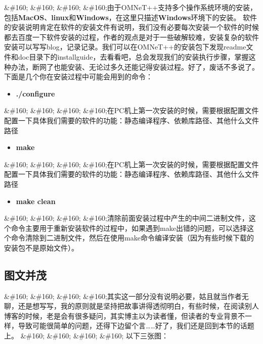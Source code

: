 \&\#160; \&\#160; \&\#160; \&\#160;由于OMNeT++支持多个操作系统环境的安装，包括\textbf{MacOS}、\textbf{linux}和\textbf{Windows}，在这里只描述\textbf{Windows}环境下的安装。
软件的安装说明肯定在软件的安装文件有说明，我们没有必要每次安装一个软件的时候都去百度一下软件安装的过程，作者的观点是对于一些破解较难，安装复杂的软件安装可以写写blog，记录记录。我们可以在OMNeT++的安装包下发现readme文件和doc目录下的installguide，去看看吧，总会发现我们的安装执行步骤，掌握这种办法，断网了也能安装、无论过多久还能记得安装过程。好了，废话不多说了。
下面是几个你在安装过程中可能会用到的命令：

\begin{itemize}
\item \textbf{.\slash configure}

\end{itemize}

\&\#160; \&\#160; \&\#160; \&\#160;在PC机上第一次安装的时候，需要根据配置文件配置一下具体我们需要的软件的功能：静态编译程序、依赖库路径、其他什么文件路径

\begin{itemize}
\item \textbf{make}

\end{itemize}

\&\#160; \&\#160; \&\#160; \&\#160;在PC机上第一次安装的时候，需要根据配置文件配置一下具体我们需要的软件的功能：静态编译程序、依赖库路径、其他什么文件路径

\begin{itemize}
\item \textbf{make clean}

\end{itemize}

\&\#160; \&\#160; \&\#160; \&\#160;清除前面安装过程中产生的中间二进制文件，这个命令主要用于重新安装软件的过程中，如果遇到make出错的问题，可以选择这个命令清除到二进制文件，然后在使用make命令编译安装（因为有些时候下载的安装包不是原始文件）。

\subsection{图文并茂}
\label{图文并茂}

\&\#160; \&\#160; \&\#160; \&\#160;其实这一部分没有说明必要，姑且就当作者无聊，还是想写写，我的原则就是坚持把故事讲得透彻明白，有些时候，在阅读别人博客的时候，老是会有很多疑问，其实博主以为读者懂，但读者的专业背景不一样，导致可能很简单的问题，还得下边留个言{\ldots}{\ldots}好了，我们还是回到本节的话题上。
\&\#160; \&\#160; \&\#160; \&\#160; 以下三张图：

